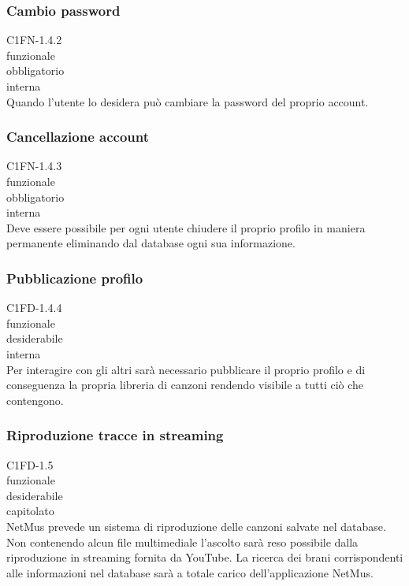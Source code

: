 \subsubsection*{Cambio password}
 C1FN-1.4.2 \\
 funzionale \\
 obbligatorio \\
 interna \\
Quando l'utente lo desidera pu\`o cambiare la password del proprio account.

\subsubsection*{Cancellazione account}
 C1FN-1.4.3 \\
 funzionale \\
 obbligatorio \\
 interna \\
Deve essere possibile per ogni utente chiudere il proprio profilo in maniera
permanente eliminando dal database ogni sua informazione.

\subsubsection*{Pubblicazione profilo}
 C1FD-1.4.4 \\
 funzionale \\
 desiderabile \\
 interna \\
Per interagire con gli altri sar\`a necessario pubblicare il proprio profilo e
di conseguenza la propria libreria di canzoni rendendo visibile a tutti ci\`o che
contengono.

\subsubsection*{Riproduzione tracce in streaming}
 C1FD-1.5 \\
 funzionale \\
 desiderabile \\
 capitolato \\
NetMus prevede un sistema di riproduzione delle canzoni salvate nel database.
Non contenendo alcun file multimediale l'ascolto sar\`a reso possibile dalla
riproduzione in streaming fornita da YouTube. La ricerca dei brani
corrispondenti alle informazioni nel database sar\`a a totale carico
dell'applicazione NetMus.

